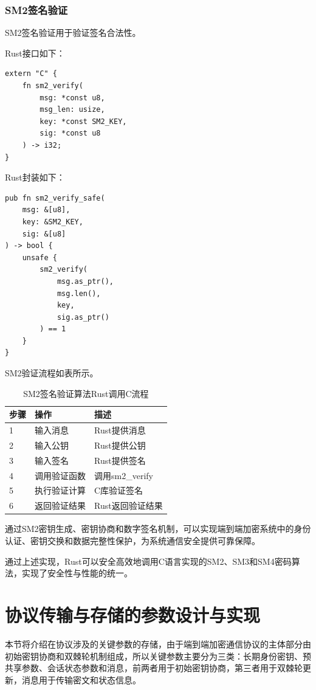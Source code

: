 \subsubsection{SM2签名验证}

SM2签名验证用于验证签名合法性。

Rust接口如下：

\begin{lstlisting}
extern "C" {
    fn sm2_verify(
        msg: *const u8,
        msg_len: usize,
        key: *const SM2_KEY,
        sig: *const u8
    ) -> i32;
}
\end{lstlisting}

Rust封装如下：

\begin{lstlisting}
pub fn sm2_verify_safe(
    msg: &[u8],
    key: &SM2_KEY,
    sig: &[u8]
) -> bool {
    unsafe {
        sm2_verify(
            msg.as_ptr(),
            msg.len(),
            key,
            sig.as_ptr()
        ) == 1
    }
}
\end{lstlisting}

SM2验证流程如表所示。

\begin{table}[H]
\centering
\caption{SM2签名验证算法Rust调用C流程}
\begin{tabular}{lll}
\toprule
步骤 & 操作 & 描述 \\
\midrule
1 & 输入消息 & Rust提供消息 \\
2 & 输入公钥 & Rust提供公钥 \\
3 & 输入签名 & Rust提供签名 \\
4 & 调用验证函数 & 调用sm2\_verify \\
5 & 执行验证计算 & C库验证签名 \\
6 & 返回验证结果 & Rust返回验证结果 \\
\bottomrule
\end{tabular}
\end{table}

通过SM2密钥生成、密钥协商和数字签名机制，可以实现端到端加密系统中的身份认证、密钥交换和数据完整性保护，为系统通信安全提供可靠保障。



通过上述实现，Rust可以安全高效地调用C语言实现的SM2、SM3和SM4密码算法，实现了安全性与性能的统一。










\section{协议传输与存储的参数设计与实现}
本节将介绍在协议涉及的关键参数的存储，由于端到端加密通信协议的主体部分由初始密钥协商和双棘轮机制组成，所以关键参数主要分为三类：长期身份密钥、预共享参数、会话状态参数和消息，前两者用于初始密钥协商，第三者用于双棘轮更新，消息用于传输密文和状态信息。

